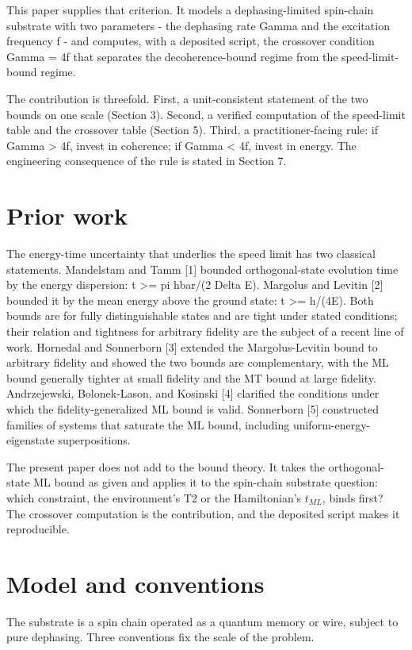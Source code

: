 \documentclass[11pt]{article}
\begin{document}
This paper supplies that criterion. It models a dephasing-limited spin-chain substrate with two parameters - the dephasing rate Gamma and the excitation frequency f - and computes, with a deposited script, the crossover condition Gamma = 4f that separates the decoherence-bound regime from the speed-limit-bound regime.

The contribution is threefold. First, a unit-consistent statement of the two bounds on one scale (Section 3). Second, a verified computation of the speed-limit table and the crossover table (Section 5). Third, a practitioner-facing rule: if Gamma > 4f, invest in coherence; if Gamma < 4f, invest in energy. The engineering consequence of the rule is stated in Section 7.

\section{Prior work}
The energy-time uncertainty that underlies the speed limit has two classical statements. Mandelstam and Tamm [1] bounded orthogonal-state evolution time by the energy dispersion: t >= pi hbar/(2 Delta E). Margolus and Levitin [2] bounded it by the mean energy above the ground state: t >= h/(4E). Both bounds are for fully distinguishable states and are tight under stated conditions; their relation and tightness for arbitrary fidelity are the subject of a recent line of work. Hornedal and Sonnerborn [3] extended the Margolus-Levitin bound to arbitrary fidelity and showed the two bounds are complementary, with the ML bound generally tighter at small fidelity and the MT bound at large fidelity. Andrzejewski, Bolonek-Lason, and Kosinski [4] clarified the conditions under which the fidelity-generalized ML bound is valid. Sonnerborn [5] constructed families of systems that saturate the ML bound, including uniform-energy-eigenstate superpositions.

The present paper does not add to the bound theory. It takes the orthogonal-state ML bound as given and applies it to the spin-chain substrate question: which constraint, the environment's T2 or the Hamiltonian's $t_{ML}$, binds first? The crossover computation is the contribution, and the deposited script makes it reproducible.

\section{Model and conventions}
The substrate is a spin chain operated as a quantum memory or wire, subject to pure dephasing. Three conventions fix the scale of the problem.
\end{document}
